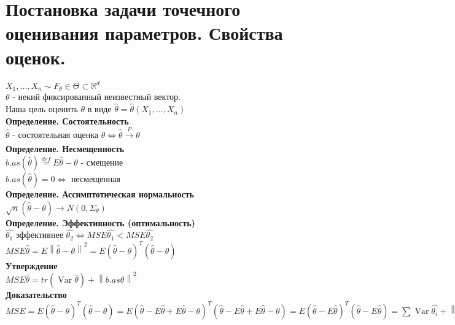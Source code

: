 \documentclass{article}
\newcommand\0{\mathbb{0}}
\DeclareMathOperator{\Var}{Var}
\newcommand\1{\mathbb{1}}
\newcommand{\norm}[1]{\left\lVert#1\right\rVert}
\begin{document}
\section{Постановка задачи точечного оценивания параметров. Свойства оценок.}
$X_1, \dots, X_n \sim F_{\theta} \in \Theta \subset \mathbb{R}^d$\\
$\theta$ - некий фиксированный неизвестный вектор.\\
Наша цель оценить $\theta$ в виде $\widehat{\theta} = \widehat{\theta}(X_1, \dots, X_n)$\\
\textbf{Определение. Состоятельность}\\
$\widehat{\theta}$ - состоятельная оценка $\theta \Leftrightarrow \widehat{\theta} \xrightarrow[]{P} \theta$\\
\textbf{Определение. Несмещенность}\\
$b.as(\widehat{\theta}) \stackrel{def}{=} E\widehat{\theta} - \theta$ - смещение\\
$b.as(\widehat{\theta}) = 0 \Leftrightarrow$ несмещенная\\
\textbf{Определение. Ассимптотическая нормальность}\\
$\sqrt{n}(\widehat{\theta} - \theta) \to N(0, \Sigma_{\theta})$\\
\textbf{Определение. Эффективность (оптимальность)}\\
$\widehat{\theta_1}$ эффективнее $\widehat{\theta_2} \Leftrightarrow MSE\widehat{\theta_1} < MSE\widehat{\theta_2}$\\
$MSE\widehat{\theta} = E\norm{\widehat{\theta} - \theta}^2 = E(\widehat{\theta} - \theta)^T(\widehat{\theta} - \theta)$\\
\textbf{Утверждение}\\
$MSE\widehat{\theta} = tr(\Var\widehat{\theta}) + \norm{b.as \widehat{\theta}}^2$\\
\textbf{Доказательство}\\
$MSE = E(\widehat{\theta} - \theta)^T(\widehat{\theta} - \theta) = E(\widehat{\theta} - E\widehat{\theta} + E\widehat{\theta} - \theta)^T(\widehat{\theta} - E\widehat{\theta} + E\widehat{\theta} - \theta) = E(\widehat{\theta} - E\widehat{\theta})^T(\widehat{\theta} - E\widehat{\theta}) = \displaystyle\sum \Var\widehat{\theta_i} + \norm{b.as \widehat{\theta}}^2$
\end{document}
